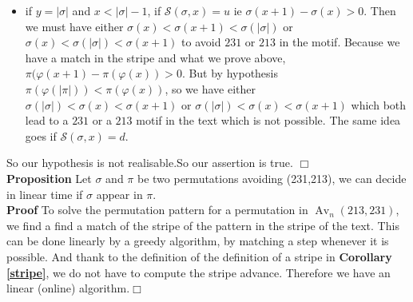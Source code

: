 \documentclass[12pt, a4paper]{article}
\DeclareMathOperator{\Avd}{Av}
\newcommand\Av[2]{\Avd_{{#1}}({#2})}
\newcommand{\ptext}{\pi}
\newcommand{\pmotif}{\sigma}
\newcounter{num}
\newcommand{\num}{\stepcounter{num} }
\newcommand{\dstep}{d}
\newcommand{\ustep}{u}
\begin{document}
\begin{itemize}
			\item if $y = |\pmotif|$ and $x<|\pmotif|-1$,
			if $\mathcal{S}(\pmotif,x)=\ustep$ ie
			$\pmotif(x+1)-\pmotif(x)>0$. Then
			we must have either
			$\pmotif(x)<\pmotif(x+1)<\pmotif(|\pmotif|)$
			or $\pmotif(x)<\pmotif(|\pmotif|)<\pmotif(x+1)$ 
			to avoid $231$ or $213$ in the motif.
			Because we have a match in the stripe
			and what we prove above,
			$\ptext(\varphi(x+1)-\ptext(\varphi(x))>0$.
			But by hypothesis $\ptext(\varphi(|\ptext|))<\ptext(\varphi(x))$,
			so we have either 		
			$\pmotif(|\pmotif|)<\pmotif(x)<\pmotif(x+1)$
			or $\pmotif(|\pmotif|)<\pmotif(x)<\pmotif(x+1)$ 
			which both lead to a $231$ or a $213$ motif
			in the text which is not possible.
			The same idea goes if $\mathcal{S}(\pmotif,x)=\dstep$. 			
			
		\end{itemize}
		So our hypothesis is not realisable.So our assertion is true. $\Box$\\
		
		\textbf{Proposition  \num \thenum} Let $\pmotif$ and $\ptext$
		be two permutations avoiding (231,213), 
		we can decide in linear time if $\pmotif$ 
		appear in $\ptext$.\\	
		
		\textbf{Proof}	
		To solve the permutation pattern for a permutation in $\Av{n}{213,231}$, 
		we find a find a match of the stripe of the pattern in the stripe of the text.
		This can be done linearly by a greedy algorithm, 
		by matching a step whenever it is possible.
		And thank to the definition of the definition of a stripe in \textbf{Corollary \ref{stripe}},
		we do not have to compute the stripe advance.
		Therefore we have an linear (online) algorithm.$\Box$\\
				

		
\end{document}
